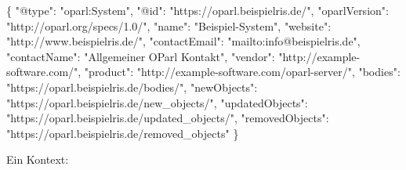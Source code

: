 \documentclass[,a4paper]{article}
\newenvironment{Shaded}{}{}
\newcommand{\DataTypeTok}[1]{\textcolor[rgb]{0.56,0.13,0.00}{{#1}}}
\newcommand{\StringTok}[1]{\textcolor[rgb]{0.25,0.44,0.63}{{#1}}}
\newcommand{\FunctionTok}[1]{\textcolor[rgb]{0.02,0.16,0.49}{{#1}}}
\begin{document}
\begin{Shaded}
\begin{Highlighting}[]
\FunctionTok{\{}
    \DataTypeTok{"@type"}\FunctionTok{:} \StringTok{"oparl:System"}\FunctionTok{,}
    \DataTypeTok{"@id"}\FunctionTok{:} \StringTok{"https://oparl.beispielris.de/"}\FunctionTok{,}
    \DataTypeTok{"oparlVersion"}\FunctionTok{:} \StringTok{"http://oparl.org/specs/1.0/"}\FunctionTok{,}
    \DataTypeTok{"name"}\FunctionTok{:} \StringTok{"Beispiel-System"}\FunctionTok{,}
    \DataTypeTok{"website"}\FunctionTok{:} \StringTok{"http://www.beispielris.de/"}\FunctionTok{,}
    \DataTypeTok{"contactEmail"}\FunctionTok{:} \StringTok{"mailto:info@beispielris.de"}\FunctionTok{,}
    \DataTypeTok{"contactName"}\FunctionTok{:} \StringTok{"Allgemeiner OParl Kontakt"}\FunctionTok{,}
    \DataTypeTok{"vendor"}\FunctionTok{:} \StringTok{"http://example-software.com/"}\FunctionTok{,}
    \DataTypeTok{"product"}\FunctionTok{:} \StringTok{"http://example-software.com/oparl-server/"}\FunctionTok{,}
    \DataTypeTok{"bodies"}\FunctionTok{:} \StringTok{"https://oparl.beispielris.de/bodies/"}\FunctionTok{,}
    \DataTypeTok{"newObjects"}\FunctionTok{:} \StringTok{"https://oparl.beispielris.de/new_objects/"}\FunctionTok{,}
    \DataTypeTok{"updatedObjects"}\FunctionTok{:} \StringTok{"https://oparl.beispielris.de/updated_objects/"}\FunctionTok{,}
    \DataTypeTok{"removedObjects"}\FunctionTok{:} \StringTok{"https://oparl.beispielris.de/removed_objects"}
\FunctionTok{\}}
\end{Highlighting}
\end{Shaded}

Ein Kontext:
\end{document}
